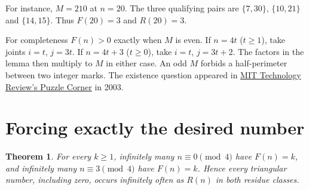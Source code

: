 \documentclass[11pt,letterpaper]{article}
\newtheorem{theorem}{Theorem}
\begin{document}
For instance, $M=210$ at $n=20$. The three qualifying pairs are $\{7,30\}$, $\{10,21\}$ and $\{14,15\}$. Thus $F(20)=3$ and $R(20)=3$.

For completeness $F(n)>0$ exactly when $M$ is even. If $n=4t$ ($t\ge1$), take joints $i=t$, $j=3t$. If $n=4t+3$ ($t\ge0$), take $i=t$, $j=3t+2$. The factors in the lemma then multiply to $M$ in either case. An odd $M$ forbids a half-perimeter between two integer marks. The existence question appeared in \href{https://cs.nyu.edu/~gottlieb/tr/back-issues/2000s/2003/5-dec.pdf}{MIT Technology Review's Puzzle Corner} in 2003.

\section*{Forcing exactly the desired number}
\begin{theorem}
For every $k\ge1$, infinitely many $n\equiv0\pmod4$ have $F(n)=k$, and infinitely many $n\equiv3\pmod4$ have $F(n)=k$. Hence every triangular number, including zero, occurs infinitely often as $R(n)$ in both residue classes.
\end{theorem}
\end{document}
